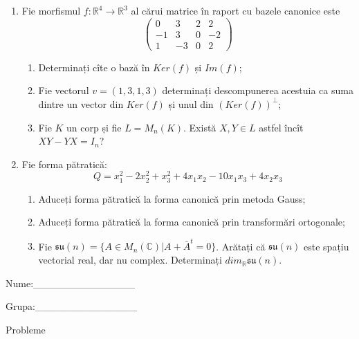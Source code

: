 \documentclass{article}
\begin{document}
\begin{enumerate}
 \item Fie morfismul $f:\mathbb{R}^4 \to \mathbb{R}^3$ al cărui matrice în raport cu bazele canonice este
$$\begin{pmatrix}
0&3&2&2\\
-1&3&0&-2\\
1&-3&0&2
\end{pmatrix}$$

\begin{enumerate}
\item Determinați cîte o bază în $Ker(f)$ și $Im(f)$;
\item Fie vectorul $v=(1,3,1,3)$ determinați descompunerea acestuia ca suma dintre un vector din $Ker(f)$ și unul din $(Ker(f))^\perp$;
\item Fie $K$ un corp și fie $L=M_n(K)$. Există $X,Y \in L$ astfel încît $XY-YX=I_n$?  
\end{enumerate}
\item Fie forma pătratică:
$$Q= x_1^2-2x_2^2+x_3^2+4x_1x_2-10x_1x_3+4x_2x_3$$

\begin{enumerate}
\item Aduceți forma pătratică la forma canonică prin metoda Gauss;
\item Aduceți forma pătratică la forma canonică prin transformări ortogonale;
\item Fie $\mathfrak{su}(n)=\{ A \in M_n(\mathbb{C}) | A+\bar{A}^t=0\}$. Arătați că $\mathfrak{su}(n)$ este spațiu vectorial real, dar nu complex.
Determinați $dim_{\mathbb{R}}\mathfrak{su}(n)$.
\end{enumerate}
\end{enumerate}
\newpage
\begin{flushright}
Nume:\_\_\_\_\_\_\_\_\_\_\_\_\_\_
 
 
Grupa:\_\_\_\_\_\_\_\_\_\_\_\_\_\_
\end{flushright}
\begin{center}
\vspace{2cm}
{\Large Probleme}
\vspace{2cm}
\end{center}
\end{document}
